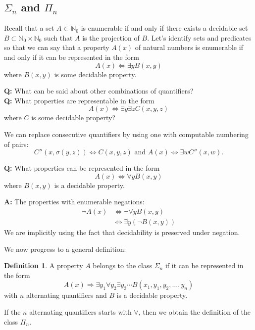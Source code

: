 \documentclass[10pt, letterpaper]{article}
\newcommand{\N}{\mathbb{N}}
\theoremstyle{remark}
\theoremstyle{definition}
\newtheorem{defn}{Definition}
\begin{document}
    \subsection*{$\Sigma_n$ and $\Pi_n$}

    Recall that a set $A \subset \N_0$ is enumerable if and only if there exists a decidable set $B \subset \N_0 \times \N_0$ such
    that $A$ is the projection of $B$. Let's identify sets and predicates so that we can say that a property $A(x)$ of natural numbers 
    is enumerable if and only if it can be represented in the form 
    \[
        A(x) \Leftrightarrow \exists y B(x,y)
    \]
    where $B(x,y)$ is some decidable property.

    \textbf{Q: } What can be said about other combinations of quantifiers? \\
    \textbf{Q: } What properties are representable in the form 
    \[
        A(x) \Leftrightarrow \exists y \exists z C(x,y,z)
    \]
    where $C$ is some decidable property?

    We can replace consecutive quantifiers by using one with computable numbering of pairs:
    \[
        C''(x,\sigma(y,z)) \Leftrightarrow C(x,y,z) \text{ and } A(x) \Leftrightarrow \exists w C''(x,w).
    \]

    \textbf{Q: } What properties can be represented in the form 
    \[
        A(x) \Leftrightarrow \forall y B(x,y)
    \]
    where $B(x,y)$ is a decidable property.

    \textbf{A: } The properties with enumerable negations:
    \begin{align*}
        \neg A(x) &\Leftrightarrow \neg \forall y B(x,y) \\
                  &\Leftrightarrow \exists y (\neg B(x,y))
    \end{align*}
    We are implicitly using the fact that decidability is preserved under negation.

    We now progress to a general definition:

    \begin{defn}
        A property $A$ belongs to the class $\Sigma_n$ if it can be represented in the form 
        \[
            A(x) \Rightarrow \exists y_1 \forall y_2 \exists y_3 \cdots B(x_1, y_1, y_2, \ldots, y_n)
        \]
        with $n$ alternating quantifiers and $B$ is a decidable property.

        If the $n$ alternating quantifiers starts with $\forall$, then we obtain the definition of the class $\Pi_n$.
    \end{defn}
\end{document}
